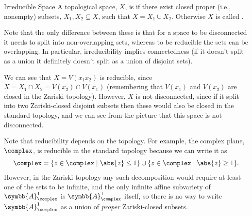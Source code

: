 \documentclass[fleqn]{NotesClass}
\newcommand{\affine}{\symbb{A}}
\begin{document}
    \begin{dfn}{Irreducible Space}{}
        A topological space, \(X\), is  if there exist closed proper (i.e., nonempty) subsets, \(X_1, X_2 \subsetneq X\), such that \(X = X_1 \cup X_2\).
        Otherwise \(X\) is called .
    \end{dfn}
    
    Note that the only difference between these is that for a space to be disconnected it needs to split into non-overlapping sets, whereas to be reducible the sets can be overlapping.
    In particular, irreducibility implies connectedness (if it doesn't split as a union it definitely doesn't split as a union of disjoint sets).
    
    We can see that \(X = V(x_1x_2)\) is reducible, since \(X = X_1 \cap X_2 = V(x_2) \cap V(x_1)\) (remembering that \(V(x_1)\) and \(V(x_2)\) are closed in the Zariski topology).
    However, \(X\) is not disconnected, since if it split into two Zariski-closed disjoint subsets then these would also be closed in the standard topology, and we can see from the picture that this space is not disconnected.
    
    \begin{exm}{}{}
        Note that reducibility depends on the topology.
        For example, the complex plane, \(\complex\), is reducible in the standard topology because we can write it as
        \begin{equation}
            \complex = \{z \in \complex \mid \abs{z} \le 1\} \cup \{z \in \complex \mid \abs{z} \ge 1\}.
        \end{equation}
        However, in the Zariski topology any such decomposition would require at least one of the sets to be infinite, and the only infinite affine subvariety of \(\affine_{\complex}^1\) is \(\affine_{\complex}^1\) itself, so there is no way to write \(\affine_{\complex}^1\) as a union of \emph{proper} Zariski-closed subsets.
    \end{exm}
    
\end{document}
